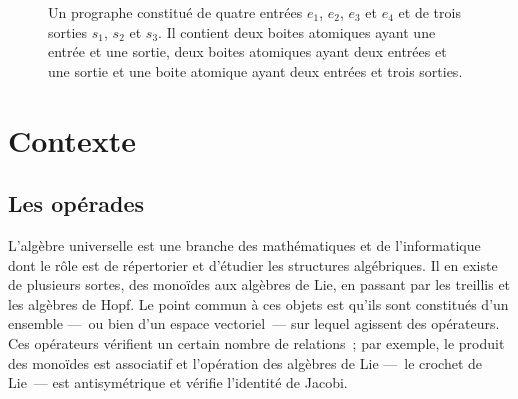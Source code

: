 \documentclass[10pt,reqno]{amsart}
\numberwithin{equation}{subsection}
\begin{document}
\begin{figure}[ht]
    
    \caption{Un prographe constitué de quatre entrées
     $e_1$, $e_2$, $e_3$ et $e_4$ et de trois sorties $s_1$, $s_2$ et 
     $s_3$. Il contient deux boites atomiques ayant une entrée et une 
     sortie, deux boites atomiques ayant deux entrées et une sortie et 
     une boite atomique ayant deux entrées et trois sorties.}
    \label{fig:exemple_prographe_circuit}
\end{figure}



\section{Contexte}

\subsection{Les opérades}
L'algèbre universelle est une branche des mathématiques et de
l'informatique dont le rôle est de répertorier et d'étudier les
structures algébriques. Il en existe de plusieurs sortes, des monoïdes
aux algèbres de Lie, en passant par les treillis et les algèbres de Hopf.
Le point commun à ces objets est qu'ils sont constitués d'un ensemble
---~ou bien d'un espace vectoriel~--- sur lequel agissent des opérateurs.
Ces opérateurs vérifient un certain nombre de relations~; par exemple,
le produit des monoïdes est associatif et l'opération des algèbres de
Lie ---~le crochet de Lie~--- est antisymétrique et vérifie l'identité
de Jacobi.
\end{document}
